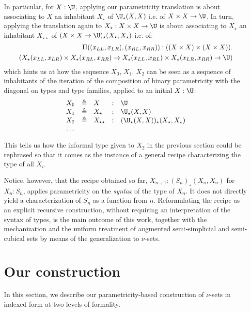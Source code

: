 \documentclass{msc}
\newcommand{\defeq}{\ensuremath{\triangleq}}
\newcommand{\kstar}{{\star}}
\begin{document}
In particular, for $X: \U$, applying our parametricity translation is about associating to $X$ an inhabitant $X_\kstar$ of ${\U}_\kstar(X,X)$ i.e. of $X \times X \rightarrow \U$. In turn, applying the translation again to $X_\kstar: X \times X \rightarrow \U$ is about associating to $X_\kstar$ an inhabitant $X_{\kstar\kstar}$ of $(X \times X \rightarrow \U)_\kstar(X_\kstar,X_\kstar)$ i.e. of:
\begin{align*}
  \Pi ((x_{LL},x_{LR}),(x_{RL},x_{RR})): ((X \times X) \times (X \times X)). \\
  (X_\kstar(x_{LL},x_{LR}) \times X_\kstar(x_{RL},x_{RR})
  \rightarrow X_\kstar(x_{LL}, x_{RL}) \times X_\kstar(x_{LR},x_{RR})  \rightarrow \U)
\end{align*}
which hints us at how the sequence $X_0$, $X_1$, $X_2$ can be seen as a sequence of inhabitants of the iteration of the composition of binary parametricity with the diagonal on types and type families, applied to an initial $X: \U$:
\begin{equation*}
  \begin{array}{lllll}
    X_0 & \defeq & X                & : & \U                                             \\
    X_1 & \defeq & X_\kstar         & : & {\U}_\kstar(X,X)                               \\
    X_2 & \defeq & X_{\kstar\kstar} & : & ({\U}_\kstar(X,X))_{\kstar}(X_\kstar,X_\kstar) \\
    \ldots
  \end{array}
\end{equation*}

This tells us how the informal type given to $X_2$ in the previous section could be rephrased so that it comes as the instance of a general recipe characterizing the type of all $X_i$.

Notice, however, that the recipe obtained so far, $X_{n + 1}: ({S_n})_\kstar(X_n,X_n)$ for $X_n: S_n$, applies parametricity on the \emph{syntax} of the type of $X_n$. It does not directly yield a characterization of $S_n$ as a function from $n$. Reformulating the recipe as an explicit recursive construction, without requiring an interpretation of the syntax of types, is the main outcome of this work, together with the mechanization and the uniform treatment of augmented semi-simplicial and semi-cubical sets by means of the generalization to $\nu$-sets.

\section{Our construction}
In this section, we describe our parametricity-based construction of $\nu$-sets in indexed form at two levels of formality.
\end{document}
